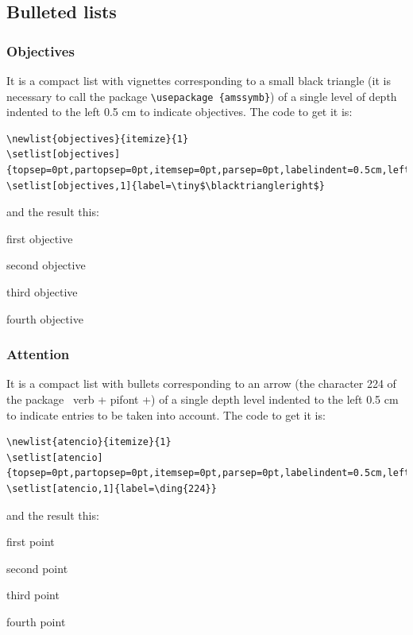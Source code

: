 \documentclass[a4paper,
                             twoside,
                             BCOR1.0cm,
                             DIV11,
                             parskip=full,
                             11pt]{scrbook}
\begin{document}
\subsection{Bulleted lists}\label{sbsec:bullist}
\subsubsection{Objectives}\label{ssbsec:objs}
It is a compact list with vignettes corresponding to a small black triangle (it is necessary to call the package \verb+\usepackage {amssymb}+) of a single level of depth indented to the left 0.5 cm to indicate objectives. The code to get it is:
\begin{tiny}
\begin{verbatim}
\newlist{objectives}{itemize}{1}
\setlist[objectives]{topsep=0pt,partopsep=0pt,itemsep=0pt,parsep=0pt,labelindent=0.5cm,leftmargin=*}
\setlist[objectives,1]{label=\tiny$\blacktriangleright$}
\end{verbatim}
\end{tiny}
and the result this:

\begin{objectives}
\item  first objective
\item second objective
\item third objective
\item fourth objective
\end{objectives}

\subsubsection{Attention}\label{ssbsec:at}
It is a compact list with bullets corresponding to an arrow (the character 224 of the package \ verb + pifont +) of a single depth level indented to the left 0.5 cm to indicate entries to be taken into account. The code to get it is:
\begin{tiny}
\begin{verbatim}
\newlist{atencio}{itemize}{1}
\setlist[atencio]{topsep=0pt,partopsep=0pt,itemsep=0pt,parsep=0pt,labelindent=0.5cm,leftmargin=*}
\setlist[atencio,1]{label=\ding{224}}
\end{verbatim}
\end{tiny}
and the result this:

\begin{attention}
\item  first point
\item second point
\item third point
\item fourth point
\end{attention}
\end{document}
